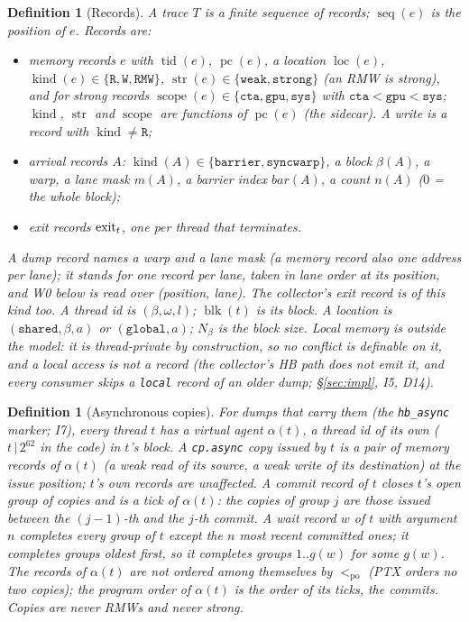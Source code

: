 \documentclass[11pt]{article}
\newtheorem{definition}[theorem]{Definition}
\theoremstyle{remark}
\DeclareMathOperator{\tid}{tid}\DeclareMathOperator{\pc}{pc}\DeclareMathOperator{\seq}{seq}
\DeclareMathOperator{\loc}{loc}\DeclareMathOperator{\blk}{blk}\DeclareMathOperator{\kind}{kind}
\DeclareMathOperator{\str}{str}\DeclareMathOperator{\scope}{scope}\DeclareMathOperator{\epoch}{epoch}
\newcommand{\PO}{<_{\mathrm{po}}}\newcommand{\HB}{\to_{\mathrm{hb}}}\newcommand{\HBr}{\trianglelefteq_{\mathrm{hb}}}
\begin{document}
\begin{definition}[Records]\label{def:records}
A trace $T$ is a finite sequence of records; $\seq(e)$ is the position of $e$. Records are:
\begin{itemize}[nosep]
\item \emph{memory records} $e$ with $\tid(e)$, $\pc(e)$, a location $\loc(e)$,
      $\kind(e)\in\{\mathtt{R},\mathtt{W},\mathtt{RMW}\}$,
      $\str(e)\in\{\mathtt{weak},\mathtt{strong}\}$ (an RMW is strong), and for strong records
      $\scope(e)\in\{\mathtt{cta},\mathtt{gpu},\mathtt{sys}\}$ with $\mathtt{cta}<\mathtt{gpu}<\mathtt{sys}$;
      $\kind$, $\str$ and $\scope$ are functions of $\pc(e)$ (the sidecar). A \emph{write} is a record with
      $\kind\ne\mathtt{R}$;
\item \emph{arrival records} $A$: $\kind(A)\in\{\mathtt{barrier},\mathtt{syncwarp}\}$, a block
      $\beta(A)$, a warp, a lane mask $m(A)$, a barrier index $\mathit{bar}(A)$, a count $n(A)$
      ($0$ = the whole block);
\item \emph{exit records} $\mathrm{exit}_{t}$, one per thread that terminates.
\end{itemize}
A dump record names a warp and a lane mask (a memory record also one address per lane); it
stands for one record per lane, taken in lane order at its position, and W0 below is read
over (position, lane). The collector's exit record is of this kind too.
A thread id is $(\beta,\omega,l)$; $\blk(t)$ is its block. A location is
$(\mathtt{shared},\beta,a)$ or $(\mathtt{global},a)$; $N_\beta$ is the block size. Local
memory is outside the model: it is thread-private by construction, so no conflict is
definable on it, and a local access is not a record (the collector's HB path does not emit
it, and every consumer skips a \texttt{local} record of an older dump; \S\ref{sec:impl},
I5, D14).
\end{definition}

\begin{definition}[Asynchronous copies]\label{def:async}
For dumps that carry them (the \texttt{hb\_async} marker; I7), every thread $t$ has a virtual
\emph{agent} $\alpha(t)$, a thread id of its own ($t\,|\,2^{62}$ in the code) in $t$'s block.
A \texttt{cp.async} copy issued by $t$ is a pair of memory records of $\alpha(t)$ (a weak read
of its source, a weak write of its destination) at the issue position; $t$'s own
records are unaffected. A \emph{commit} record of $t$ closes $t$'s open group of copies and is a
tick of $\alpha(t)$: the copies of group $j$ are those issued between the $(j{-}1)$-th and the
$j$-th commit. A \emph{wait} record $w$ of $t$ with argument $n$ completes every group of $t$
except the $n$ most recent committed ones; it completes groups oldest first, so it completes
groups $1..g(w)$ for some $g(w)$. The records of $\alpha(t)$ are not ordered among
themselves by $\PO$ (PTX orders no two copies); the program order of $\alpha(t)$ is the order
of its ticks, the commits. Copies are never RMWs and never strong.
\end{definition}
\end{document}
